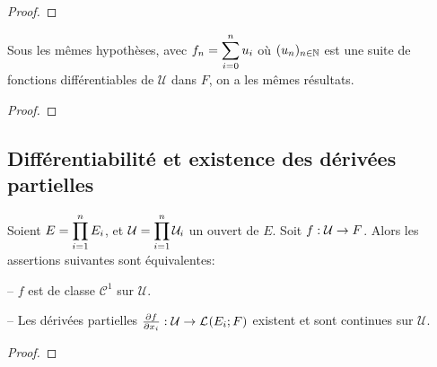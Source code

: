 \ifdefined\outputproof
\begin{proof}

\end{proof}
\fi

\begin{corollary}
	Sous les mêmes hypothèses, avec $f_{n} = \displaystyle \sum_{i = 0}^{n} u_{i}$ où
	$(u_{n})_{n \in \mathbb{N}}$ est une suite de fonctions différentiables de
	$\mathcal{U}$ dans $F$, on a les mêmes résultats.
\end{corollary}

\ifdefined\outputproof
\begin{proof}

\end{proof}
\fi


\subsection{Différentiabilité et existence des dérivées partielles}


\begin{theorem}
	\label{theorem:partial_derivative_existence}

	Soient $E = \displaystyle \prod_{i = 1}^{n} E_{i}$, et $\mathcal{U} =
	\displaystyle \prod_{i = 1}^{n} \mathcal{U}_{i}$ un ouvert de $E$.
	Soit $f : \mathcal{U} \rightarrow F$.
	Alors les assertions suivantes sont équivalentes:

	-- $f$ est de classe $\mathcal{C}^{1}$ sur $\mathcal{U}$.

	-- Les dérivées partielles
	$\pdv{f}{x_{i}} : \mathcal{U} \rightarrow \mathcal{L}_{}(E_{i}; F)$
	existent et sont continues sur $\mathcal{U}$.
\end{theorem}

\ifdefined\outputproof
\begin{proof}

\end{proof}
\fi
